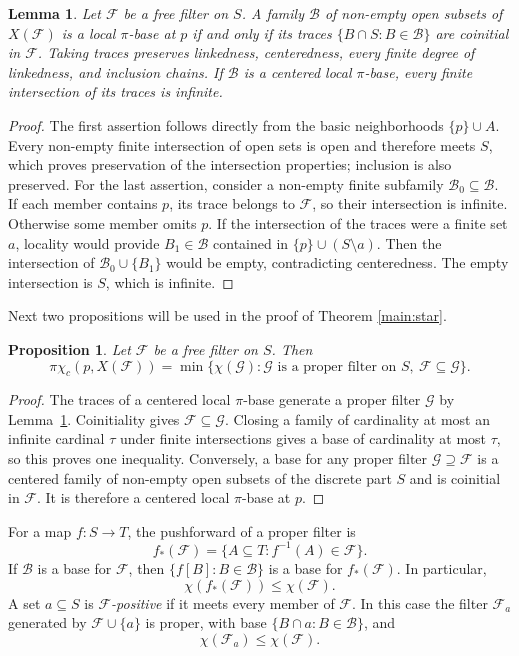 \documentclass[10pt,a4paper]{amsart}
\newtheorem{proposition}[theorem]{Proposition}
\newtheorem{lemma}[theorem]{Lemma}
\theoremstyle{definition}
\theoremstyle{remark}
\newcommand{\F}{\mathcal F}
\newcommand{\G}{\mathcal G}
\newcommand{\B}{\mathcal B}
\newcommand{\pcc}{\pi\chi_c}
\begin{document}
\begin{lemma}\label{lem:traces}
Let $\F$ be a free filter on $S$. A family $\B$ of non-empty open subsets of $X(\F)$ is a local $\pi$-base at $p$ if and only if its traces $\{B\cap S:B\in\B\}$ are coinitial in $\F$. Taking traces preserves linkedness, centeredness, every finite degree of linkedness, and inclusion chains. If $\B$ is a centered local $\pi$-base, every finite intersection of its traces is infinite.
\end{lemma}
\begin{proof}
The first assertion follows directly from the basic neighborhoods $\{p\}\cup A$. Every non-empty finite intersection of open sets is open and therefore meets $S$, which proves preservation of the intersection properties; inclusion is also preserved. For the last assertion, consider a non-empty finite subfamily $\B_0\subseteq\B$. If each member contains $p$, its trace belongs to $\F$, so their intersection is infinite. Otherwise some member omits $p$. If the intersection of the traces were a finite set $a$, locality would provide $B_1\in\B$ contained in $\{p\}\cup(S\setminus a)$. Then the intersection of $\B_0\cup\{B_1\}$ would be empty, contradicting centeredness. The empty intersection is $S$, which is infinite.
\end{proof}
Next two propositions will be used in the proof of Theorem \ref{main:star}.
\begin{proposition}\label{prop:extensions}
Let $\F$ be a free filter on $S$. Then
\begin{equation}\label{eq:extensions}
\pcc(p,X(\F))=
\min\{\chi(\G):\G\text{ is a proper filter on }S,\ \F\subseteq\G\}.
\end{equation}
\end{proposition}
\begin{proof}
The traces of a centered local $\pi$-base generate a proper filter $\G$ by Lemma~\ref{lem:traces}. Coinitiality gives $\F\subseteq\G$. Closing a family of cardinality at most an infinite cardinal $\tau$ under finite intersections gives a base of cardinality at most $\tau$, so this proves one inequality. Conversely, a base for any proper filter $\G\supseteq\F$ is a centered family of non-empty open subsets of the discrete part $S$ and is coinitial in $\F$. It is therefore a centered local $\pi$-base at $p$.
\end{proof}

For a map $f:S\to T$, the pushforward of a proper filter is
\[
f_*(\F)=\{A\subseteq T:f^{-1}(A)\in\F\}.
\]
If $\B$ is a base for $\F$, then $\{f[B]:B\in\B\}$ is a base for $f_*(\F)$. In particular,
\begin{equation}\label{eq:pushcharacter}
\chi(f_*(\F))\leqslant\chi(\F).
\end{equation}
A set $a\subseteq S$ is \emph{$\F$-positive} if it meets every member of $\F$. In this case the filter $\F_a$ generated by $\F\cup\{a\}$ is proper, with base $\{B\cap a:B\in\B\}$, and
\begin{equation}\label{eq:restrictcharacter}
\chi(\F_a)\leqslant\chi(\F).
\end{equation}
\end{document}
